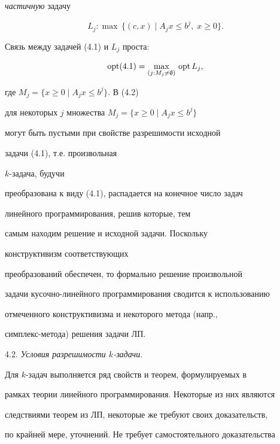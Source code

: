 {\it частичную} задачу


\begin{equation}


L_j: \max\, \{ (c, x) \mid A_j x \le b^j,\; x \ge 0 \}.


\end{equation}


Связь между задачей (4.1) и $L_j$ проста:


\begin{equation}


\opt (4.1) = \max_{(j: M_j \ne \emp)}\,\opt L_j,


\end{equation}


где $M_j = \{ x \ge 0 \mid A_j x \le b^j \}$. В (4.2)


для некоторых $j$ множества $M_j = \{ x \ge 0 \mid A_j x \le b^j \}$


могут быть пустыми при свойстве разрешимости исходной


задачи (4.1), т.е. произвольная \linebreak


$k$-задача, будучи


преобразована к виду (4.1), распадается на конечное число задач


линейного программирования, решив которые, тем


самым находим решение и исходной задачи. Поскольку


конструктивизм соответствующих


преобразований обеспечен, то формально решение произвольной


задачи кусочно-линейного программирования сводится к использованию


отмеченного конструктивизма и некоторого метода (напр.,


симплекс-метода) решения задачи ЛП.


\medskip





4.2. {\it Условия разрешимости $k$-задачи}.


Для $k$-задач выполняется ряд свойств и теорем, формулируемых в


рамках теории линейного программирования. Некоторые из них являются


следствиями теорем из ЛП, некоторые же требуют своих доказательств,


по крайней мере, уточнений. Не требует самостоятельного доказательства





